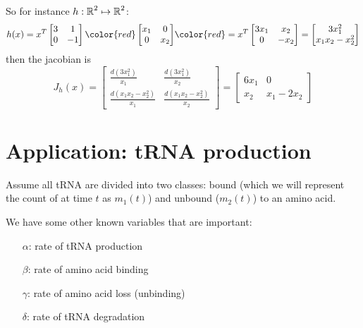 So for instance $h:\operatorname{\mathbb{R}}^2\mapsto\operatorname{\mathbb{R}}^2$:
\[h(x) = x^T\begin{bmatrix}3 & 1\\0 & -1\end{bmatrix}{\color{red}\begin{bmatrix}x_1 & 0\\ 0 & x_2\end{bmatrix}} 
{\color{red}=x^T \begin{bmatrix}3x_1 & x_2\\0&-x_2\end{bmatrix}}
= \begin{bmatrix}3x_1^2\\x_1x_2 -x_2^2\end{bmatrix}\]
then the jacobian is 
\[J_h(x) = \begin{bmatrix} 
\frac{d(3x_1^2)}{x_1} & \frac{d(3x_1^2)}{x_2}\\
\frac{d(x_1x_2 -x_2^2)}{x_1} & \frac{d(x_1x_2 -x_2^2)}{x_2}\end{bmatrix} = 
\begin{bmatrix} 
6x_1 & 0\\
x_2 & x_1-2x_2
\end{bmatrix}
\]


\iffalse
\section{Application: tRNA production}
Assume all tRNA are divided into two classes: bound (which we will represent the count of at time $t$ as $m_1(t)$) 
and unbound ($m_2(t)$) to an amino acid.

We have some other known variables that are important: 
\begin{itemize}
\item[$\alpha$:] rate of tRNA production
\item[$\beta$:] rate of amino acid binding
\item[$\gamma$:]rate of amino acid loss (unbinding)
\item[$\delta$:] rate of tRNA degradation
\end{itemize}

